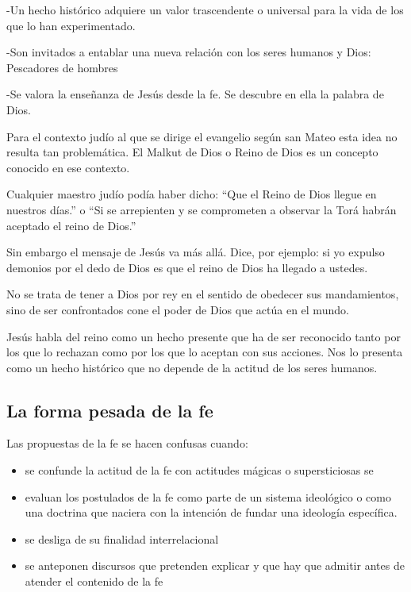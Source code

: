 \documentclass[10pt]{article}
\begin{document}
    -Un hecho histórico adquiere un valor trascendente o universal para la vida
    de los que lo han experimentado. 

    -Son invitados a entablar una nueva relación con los seres humanos y Dios:
    Pescadores de hombres

    -Se valora la enseñanza de Jesús desde la fe. Se descubre en ella la palabra
    de Dios.

    Para el contexto judío al que se dirige el evangelio según san Mateo esta
    idea no resulta tan problemática. El Malkut de Dios o Reino de Dios es un
    concepto conocido en ese contexto.

    Cualquier maestro judío podía haber dicho: ``Que el Reino de Dios llegue en
    nuestros días.'' o ``Si se arrepienten y se comprometen a observar la Torá
    habrán aceptado el reino de Dios.''

    Sin embargo el mensaje de Jesús va más allá. Dice, por ejemplo: si yo
    expulso demonios por el dedo de Dios es que el reino de Dios ha llegado a
    ustedes.

    No se trata de tener a Dios por rey en el sentido de obedecer sus
    mandamientos, sino de ser confrontados cone el poder de Dios que actúa
    en el mundo.

    Jesús habla del reino como un hecho presente que ha de ser reconocido tanto por
    los que lo rechazan como por los que lo aceptan con sus acciones. Nos lo
    presenta como un hecho histórico que no depende de la actitud de los seres
    humanos.

\subsection{La forma pesada de la fe}
    Las propuestas de la fe se hacen confusas cuando:
  \begin{itemize}
  \item se confunde la actitud de la fe con actitudes mágicas o
    supersticiosas se

  \item evaluan los postulados de la fe como parte de un sistema
    ideológico o como una doctrina que naciera con la intención de
    fundar una ideología específica.

  \item se desliga de su finalidad interrelacional

  \item se anteponen discursos que pretenden explicar y que hay que
    admitir antes de atender el contenido de la fe
    \end{itemize}
\end{document}
